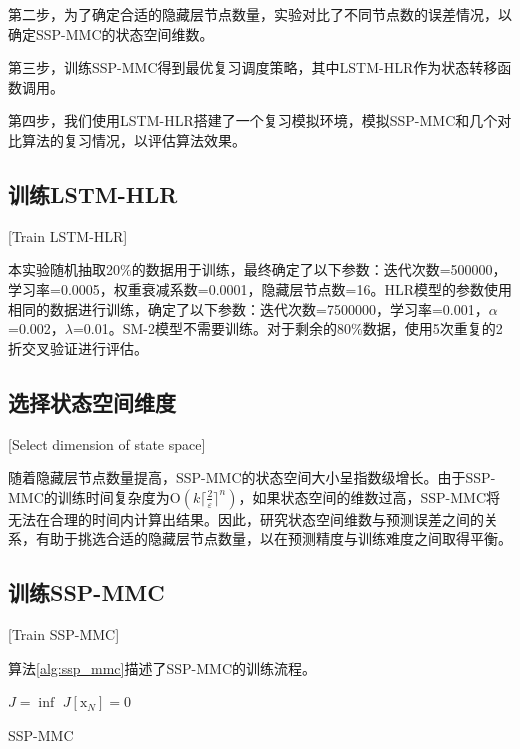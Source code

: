 第二步，为了确定合适的隐藏层节点数量，实验对比了不同节点数的误差情况，以确定SSP-MMC的状态空间维数。

第三步，训练SSP-MMC得到最优复习调度策略，其中LSTM-HLR作为状态转移函数调用。

第四步，我们使用LSTM-HLR搭建了一个复习模拟环境，模拟SSP-MMC和几个对比算法的复习情况，以评估算法效果。

\subsection{训练LSTM-HLR}[Train LSTM-HLR]

本实验随机抽取20\%的数据用于训练，最终确定了以下参数：迭代次数=500000，学习率=0.0005，权重衰减系数=0.0001，隐藏层节点数=16。HLR模型的参数使用相同的数据进行训练，确定了以下参数：迭代次数=7500000，学习率=0.001，$\alpha$=0.002，$\lambda$=0.01。SM-2模型不需要训练。对于剩余的80\%数据，使用5次重复的2折交叉验证\cite{dietterichApproximateStatisticalTests1998}进行评估。

\subsection{选择状态空间维度}[Select dimension of state space]

随着隐藏层节点数量提高，SSP-MMC的状态空间大小呈指数级增长。由于SSP-MMC的训练时间复杂度为$\mathrm O(k\lceil\frac{2}{\varepsilon}\rceil^n)$，如果状态空间的维数过高，SSP-MMC将无法在合理的时间内计算出结果。因此，研究状态空间维数与预测误差之间的关系，有助于挑选合适的隐藏层节点数量，以在预测精度与训练难度之间取得平衡。

\subsection{训练SSP-MMC}[Train SSP-MMC]

算法\ref{alg:ssp_mmc}描述了SSP-MMC的训练流程。

\begin{algorithm}[htbp]
    $J = \inf$\;
    $J[\bm{\mathrm{x}}_{N}] = 0$\;
\caption{SSP-MMC}
\label{alg:ssp_mmc}
\end{algorithm}

